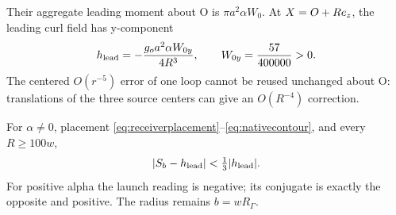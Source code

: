 Their aggregate leading moment about O is \(\pi a^2\alpha W_0\). At \(X=O+Re_z\), the leading curl field has y-component
\begin{equation}\label{eq:leadingcomponent}
h_{\rm lead}=-\frac{g_oa^2\alpha W_{0y}}{4R^3},\qquad
W_{0y}=\frac{57}{400000}>0.
\end{equation}
The centered \(O(r^{-5})\) error of one loop cannot be reused unchanged about O: translations of the three source centers can give an \(O(R^{-4})\) correction.

\begin{theorem}\label{thm:native}
For \(\alpha\ne0\), placement \eqref{eq:receiverplacement}--\eqref{eq:nativecontour}, and every \(R\ge100w\),
\begin{equation}\label{eq:thirdbound}
|S_b-h_{\rm lead}|<\tfrac13|h_{\rm lead}|.
\end{equation}
For positive alpha the launch reading is negative; its conjugate is exactly the opposite and positive. The radius remains \(b=wR_\Gamma\).
\end{theorem}
